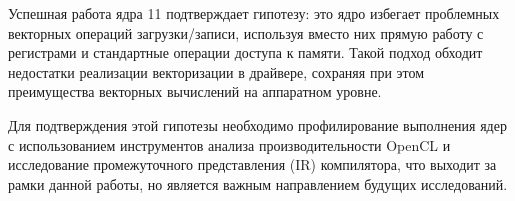 Успешная работа ядра 11 подтверждает гипотезу: это ядро избегает проблемных векторных операций загрузки/записи, используя вместо них прямую работу с регистрами и стандартные операции доступа к памяти. Такой подход обходит недостатки реализации векторизации в драйвере, сохраняя при этом преимущества векторных вычислений на аппаратном уровне.

Для подтверждения этой гипотезы необходимо профилирование выполнения ядер с использованием инструментов анализа производительности OpenCL и исследование промежуточного представления (IR) компилятора, что выходит за рамки данной работы, но является важным направлением будущих исследований.